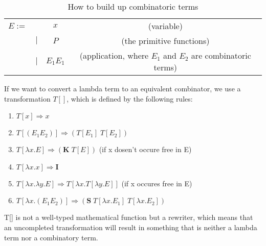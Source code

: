 \begin{table}[]
    \centering
    \begin{tabular}{c c c | c}
         $E :=$&  & $x$ & (variable)\\
         & $|$ & $P$ & (the primitive functions) \\
         & $|$ & $E_1 E_1$ & (application, where $E_1$ and $E_2$ are combinatoric terms)\\
    \end{tabular}
    \caption{How to build up combinatoric terms}
    \label{tab:makeCombinatoricTerms}
\end{table}

\para
If we want to convert a lambda term to an equivalent combinator, we use a transformation $T[]$, which is defined by the following rules:
\begin{enumerate}
    \item $T[x] \Rightarrow x$
    \item $T[(E_1 E_2)] \Rightarrow (T[E_1]\; T[E_2])$
    \item $T[\lambda x.E] \Rightarrow (\textbf{K}\; T[E])$ (if x dosen't occure free in E)
    \item $T[\lambda x.x]\Rightarrow \textbf{I}$
    \item $T[\lambda x. \lambda y.E]\Rightarrow T[\lambda x.T[\lambda y.E]]$ (if x occures free in E)
    \item $T[\lambda x.(E_1 E_2)] \Rightarrow (\textbf{S} \; T[\lambda x.E_1] \; T[\lambda x.E_2])$
\end{enumerate}
T[] is not a well-typed mathematical function but a rewriter, which means that an uncompleted transformation will result in something that is neither a lambda term nor a combinatory term. 

